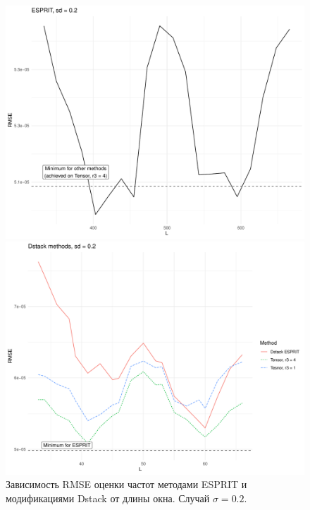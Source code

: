 \documentclass[specialist,
  substylefile=spbu_report.rtx,
subf,href,colorlinks=true, 12pt]{disser}
\theoremstyle{plain}
\theoremstyle{definition}
\theoremstyle{remark}
\begin{document}
\begin{figure}[!ht]
  \begin{minipage}{0.48\textwidth}
    \centering
    \includegraphics[width=\textwidth]{htlsd_byL_real_param_rmse_esprit_2.pdf}
  \end{minipage}
  \begin{minipage}{0.48\textwidth}
    \centering
    \includegraphics[width=\textwidth]{htlsd_byL_real_param_rmse_dstack_2.pdf}
  \end{minipage}
  \caption{Зависимость RMSE оценки частот методами ESPRIT и
  модификациями Dstack от длины окна. Случай $\sigma = 0.2$.}
  \label{fig:dstack-esprit-byL-small}
\end{figure}
\end{document}
